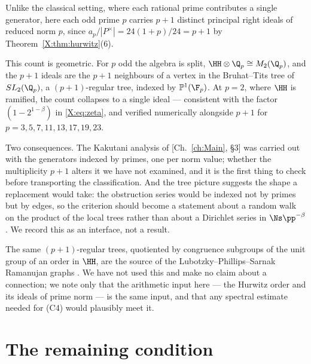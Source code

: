 \begin{remark}\label{X:rem:mult}
Unlike the classical setting, where each rational prime contributes a single generator, here
each odd prime $p$ carries $p+1$ distinct principal right ideals of reduced norm $p$, since
$a_p/|P^\times|=24(1+p)/24=p+1$ by Theorem~\ref{X:thm:hurwitz}(6).

This count is geometric. For $p$ odd the algebra is split, $\HH\otimes\Q_p\cong M_2(\Q_p)$,
and the $p+1$ ideals are the $p+1$ neighbours of a vertex in the Bruhat--Tits tree of
$SL_2(\Q_p)$, a $(p+1)$-regular tree, indexed by $\mathbb P^1(\F_p)$. At $p=2$, where $\HH$
is ramified, the count collapses to a single ideal --- consistent with the factor
$(1-2^{1-\beta})$ in \eqref{X:eq:zeta}, and verified numerically alongside
$p+1$ for $p=3,5,7,11,13,17,19,23$.

Two consequences. The Kakutani analysis of [Ch.~\ref{ch:Main}, \S3] was carried out with the
generators indexed by primes, one per norm value; whether the multiplicity $p+1$ alters it we have not examined, and
it is the first thing to check before transporting the classification. And the tree picture
suggests the shape a replacement would take: the obstruction series would be indexed not by
primes but by edges, so the criterion should become a statement about a random walk on the
product of the local trees rather than about a Dirichlet series in $\Ns\pp^{-\beta}$. We
record this as an interface, not a result.
\end{remark}

\begin{remark}\label{X:rem:ramanujan}
The same $(p+1)$-regular trees, quotiented by congruence subgroups of the unit group of an
order in $\HH$, are the source of the Lubotzky--Phillips--Sarnak Ramanujan graphs
\cite{LPS}. We have
not used this and make no claim about a connection; we note only that the arithmetic input
here --- the Hurwitz order and its ideals of prime norm --- is the same input, and that any
spectral estimate needed for (C4) would plausibly meet it.
\end{remark}

\section{The remaining condition}

